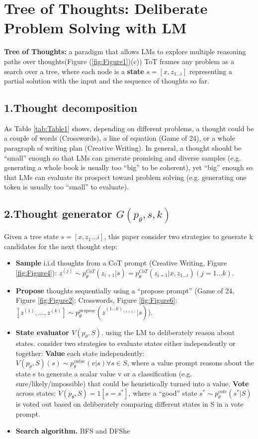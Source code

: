 \documentclass{article}
\begin{document}
\section{Tree of Thoughts: Deliberate Problem Solving with LM}

\textbf{Tree of Thoughts:} a paradigm that allows LMs to explore multiple reasoning paths over thoughts(Figure (\ref{fig:Figure1})(c))
ToT frames any problem as a search over a tree, where each node is a \textbf{state} $s = [x,z_{1...i}]$ representing a partial solution with the input and the sequence of thoughts so far.

\subsection*{1.Thought decomposition}
As Table \ref{tab:Table1} shows, depending on different problems, a thought could be a couple of words (Crosswords), a line of equation (Game of 24), or a whole paragraph of writing plan (Creative Writing).
In general, a thought should be “small” enough so that LMs can generate promising and diverse samples (e.g. generating a whole book is usually too “big” to be coherent), yet “big” enough so that LMs can evaluate its prospect toward problem solving (e.g. generating one token is usually too “small” to evaluate).

\subsection*{2.Thought generator $G(p_{\theta},s,k)$}
Given a tree state $s = [x,z_1...i]$, this paper consider two strategies to generate k candidates for the next thought step:
\begin{itemize}
    \item \textbf{Sample} i.i.d thoughts from a CoT prompt (Creative Writing, Figure \ref{fig:Figure4}): $z^{(j)} \sim p^{CoT}_{\theta}(z_{i+1}|s) = p^{CoT}_{\theta}(z_{i+1}|x,z_{1...i})(j=1...k)$.
    \item \textbf{Propose} thoughts sequentially using a “propose prompt” (Game of 24, Figure \ref{fig:Figure2}; Crosswords, Figure \ref{fig:Figure6}: 
    $[z^{(1)},...,z^{(k)}]\sim p^{propose}_{\theta}(z^{(1...k)_(i+1)}|s)$).
    \item \textbf{State evaluator $V(p_{\theta},S)$}. using the LM to deliberately reason about states. consider two strategies to evaluate states either independently or together:
        \subitem \textbf{Value} each state independently: $V(p_{\theta},S)(s) \sim p^{value}_{\theta}(v|s) \forall s \in S$, where a value prompt reasons about the state s to generate a scalar value v
            or a classification (e.g. sure/likely/impossible) that could be heuristically turned into a value.
        \subitem \textbf{Vote} across states: $V(p_{\theta},S) = 1 [s = s^{*}]$, where a “good” state $s^* \sim p_{\theta}^{vote}(s^*|S)$ is voted out based on deliberately comparing different states in S in a vote prompt.
    \item \textbf{Search algorithm.} BFS and DFShe
\end{itemize}
\end{document}
